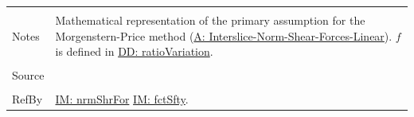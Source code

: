 \documentclass[12pt]{article}
\begin{document}
\begin{minipage}{\textwidth}
\begin{tabular}{p{} p{}}
                                         \\ \midrule \\
                                         Notes & Mathematical representation of the primary assumption for the Morgenstern-Price method (\hyperref[assumpINSFL]{A: Interslice-Norm-Shear-Forces-Linear}). $f$ is defined in \hyperref[DD:ratioVariation]{DD: ratioVariation}.
                                                 \\ \midrule \\
                                                 Source & \cite{chen2005}
                                                          \\ \midrule \\
                                                          RefBy & \hyperref[IM:nrmShrFor]{IM: nrmShrFor} \hyperref[IM:fctSfty]{IM: fctSfty}.
\\ \bottomrule \end{tabular}
\end{minipage}
\par~
\end{document}
